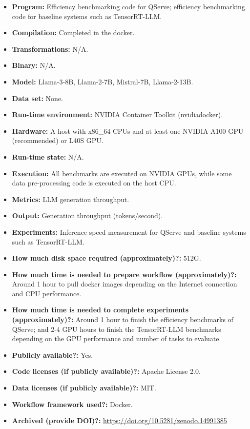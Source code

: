 {\small
\begin{itemize}
  \item {\bf Program:} Efficiency benchmarking code for QServe; efficiency benchmarking code for baseline systems such as TensorRT-LLM.
  \item {\bf Compilation:} Completed in the docker.
  \item {\bf Transformations:} N/A. 
  \item {\bf Binary:} N/A.
  \item {\bf Model:} Llama-3-8B, Llama-2-7B, Mistral-7B, Llama-2-13B.
  \item {\bf Data set:} None.
  \item {\bf Run-time environment:} NVIDIA Container Toolkit (nvidiadocker).
  \item {\bf Hardware:} A host with x86\_64 CPUs and at least one NVIDIA A100 GPU (recommended) or L40S GPU.
  \item {\bf Run-time state:} N/A.
  \item {\bf Execution:} All benchmarks are executed on NVIDIA GPUs, while some data pre-processing code is executed on the host CPU.
  \item {\bf Metrics:} LLM generation throughput.
  \item {\bf Output:} Generation throughput (tokens/second).
  \item {\bf Experiments:} Inference speed measurement for QServe and baseline systems such as TensorRT-LLM.
  \item {\bf How much disk space required (approximately)?:} 512G.
  \item {\bf How much time is needed to prepare workflow (approximately)?:} Around 1 hour to pull docker images depending on the Internet connection and CPU performance.
  \item {\bf How much time is needed to complete experiments (approximately)?:} Around 1 hour to finish the efficiency benchmarks of QServe; and 2-4 GPU hours to finish the TensorRT-LLM benchmarks depending on the GPU performance and number of tasks to evaluate.
  \item {\bf Publicly available?:} Yes.
  \item {\bf Code licenses (if publicly available)?:} Apache License 2.0.
  \item {\bf Data licenses (if publicly available)?:} MIT.
  \item {\bf Workflow framework used?:} Docker.
  \item {\bf Archived (provide DOI)?:} \url{https://doi.org/10.5281/zenodo.14991385}
\end{itemize}

}
